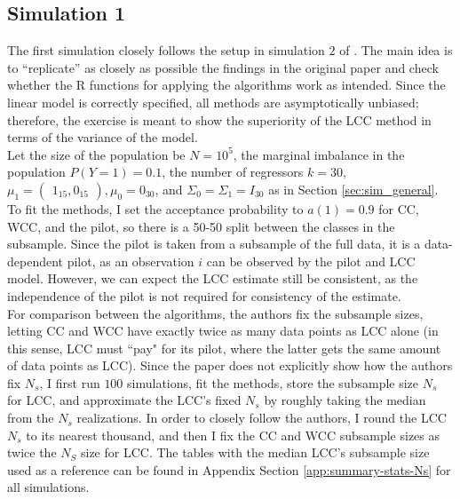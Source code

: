 \subsection{Simulation 1}
\label{sec:sim1}

The first simulation closely follows the setup in simulation $2$ of \textcite{hastie2014}. The main idea is to ``replicate'' as closely as possible the findings in the original paper and check whether the R functions for applying the algorithms work as intended. Since the linear model is correctly specified, all methods are asymptotically unbiased; therefore, the exercise is meant to show the superiority of the LCC method in terms of the variance of the model.\\

Let the size of the population be $N=10^5$, the marginal imbalance in the population $P(Y=1) = 0.1$, the number of regressors $k=30$, $\mu_1=(\begin{array}{l}1_{15}, 0_{15}\end{array}), \mu_0=0_{30}$, and $\Sigma_0=\Sigma_1=I_{30}$ as in Section \ref{sec:sim_general}. To fit the methods, I set the acceptance probability to $a(1)=0.9$ for CC, WCC, and the pilot, so there is a 50-50 split between the classes in the subsample. Since the pilot is taken from a subsample of the full data, it is a data-dependent pilot, as an observation $i$ can be observed by the pilot and LCC model. However, we can expect the LCC estimate still be consistent, as the independence of the pilot is not required for consistency of the estimate.\\

For comparison between the algorithms, the authors fix the subsample sizes, letting CC and WCC have exactly twice as many data points as LCC alone (in this sense, LCC must ``pay" for its pilot, where the latter gets the same amount of data points as LCC). Since the paper does not explicitly show how the authors fix $N_s$, I first run $100$ simulations, fit the methods, store the subsample size $N_s$ for LCC, and approximate the LCC's fixed $N_s$ by roughly taking the median from the $N_s$ realizations. In order to closely follow the authors, I round the LCC $N_s$ to its nearest thousand, and then I fix the CC and WCC subsample sizes as twice the $N_S$ size for LCC. The tables with the median LCC's subsample size used as a reference can be found in Appendix Section \ref{app:summary-stats-Ns} for all simulations.\\

